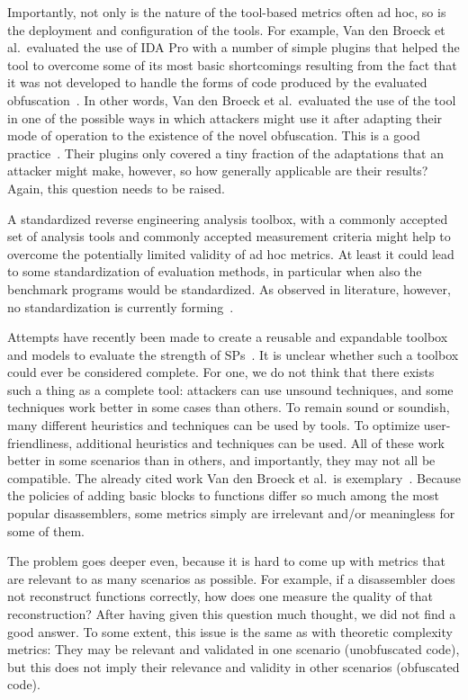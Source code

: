 Importantly, not only is the nature of the tool-based metrics often ad hoc, so is the deployment and configuration of the tools. For example, Van den Broeck et al.\ evaluated the use of IDA Pro with a number of simple plugins that helped the tool to overcome some of its most basic shortcomings resulting from the fact that it was not developed to handle the forms of code produced by the evaluated obfuscation~\cite{jens21}. In other words, Van den Broeck et al.\ evaluated the use of the tool in one of the possible ways in which attackers might use it after adapting their mode of operation to the existence of the novel obfuscation. This is a good practice~\cite{desutter2024evaluation}. Their plugins only covered a tiny fraction of the adaptations that an attacker might make, however, so how generally applicable are their results? Again, this question needs to be raised. 

A standardized reverse engineering analysis toolbox, with a commonly accepted set of analysis tools and commonly accepted measurement criteria might help to overcome the potentially limited validity of ad hoc metrics. At least it could lead to some standardization of evaluation methods, in particular when also the benchmark programs would be standardized. As observed in literature, however, no standardization is currently forming~\cite{desutter2024evaluation}. 

Attempts have recently been made to create a reusable and expandable toolbox and models to evaluate the strength of SPs~\cite{checkmate24}. It is unclear whether such a toolbox could ever be considered complete. For one, we do not think that there exists such a thing as a complete tool: attackers can use unsound techniques, and some techniques work better in some cases than others. To remain sound or soundish, many different heuristics and techniques can be used by tools. To optimize user-friendliness, additional heuristics and techniques can be used. All of these work better in some scenarios than in others, and importantly, they may not all be compatible. The already cited work Van den Broeck et al.\ is exemplary~\cite{jens21}. Because the policies of adding basic blocks to functions differ so much among the most popular disassemblers, some metrics simply are irrelevant and/or meaningless for some of them. 

The problem goes deeper even, because it is hard to come up with metrics that are relevant to as many scenarios as possible. For example, if a disassembler does not reconstruct functions correctly, how does one measure the quality of that reconstruction? After having given this question much thought, we did not find a good answer. To some extent, this issue is the same as with theoretic complexity metrics: They may be relevant and validated in one scenario (unobfuscated code), but this does not imply their relevance and validity in other scenarios (obfuscated code). 

